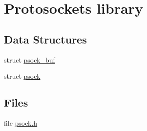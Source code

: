 \hypertarget{group__psock}{
\section{Protosockets library}
\label{group__psock}
}
\subsection*{Data Structures}
\begin{DoxyCompactItemize}
\item 
struct \hyperlink{structpsock__buf}{psock\_\-buf}
\item 
struct \hyperlink{structpsock}{psock}
\end{DoxyCompactItemize}
\subsection*{Files}
\begin{DoxyCompactItemize}
\item 
file \hyperlink{psock_8h}{psock.h}
\end{DoxyCompactItemize}
